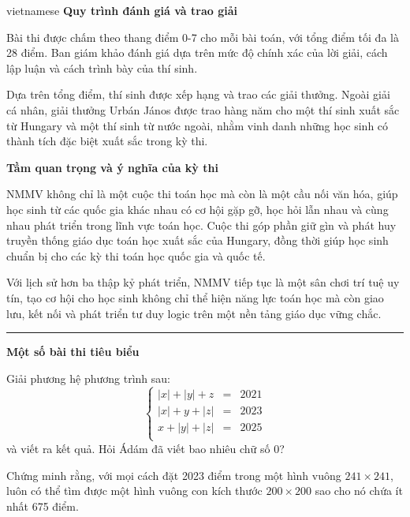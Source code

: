 \documentclass{article}
\begin{document}
\begin{otherlanguage*}{vietnamese}
\textbf{Quy trình đánh giá và trao giải}

Bài thi được chấm theo thang điểm 0-7 cho mỗi bài toán, với tổng điểm tối đa là 28 điểm.
Ban giám khảo đánh giá dựa trên mức độ chính xác của lời giải, cách lập luận và cách trình bày của thí sinh.

Dựa trên tổng điểm, thí sinh được xếp hạng và trao các giải thưởng.
Ngoài giải cá nhân, giải thưởng Urbán János được trao hàng năm cho một thí sinh xuất sắc từ Hungary và một thí sinh từ nước ngoài,
nhằm vinh danh những học sinh có thành tích đặc biệt xuất sắc trong kỳ thi.

\textbf{Tầm quan trọng và ý nghĩa của kỳ thi}

NMMV không chỉ là một cuộc thi toán học mà còn là một cầu nối văn hóa, giúp học sinh từ các quốc gia khác nhau có cơ hội gặp gỡ, học hỏi lẫn nhau và cùng nhau phát triển trong lĩnh vực toán học.
Cuộc thi góp phần giữ gìn và phát huy truyền thống giáo dục toán học xuất sắc của Hungary, đồng thời giúp học sinh chuẩn bị cho các kỳ thi toán học quốc gia và quốc tế.

Với lịch sử hơn ba thập kỷ phát triển, NMMV tiếp tục là một sân chơi trí tuệ uy tín, tạo cơ hội cho học sinh không chỉ thể hiện năng lực toán học mà còn giao lưu,
kết nối và phát triển tư duy logic trên một nền tảng giáo dục vững chắc.

\bigbreak

\noindent\rule{16.5cm}{0.4pt}

\textbf{Một số bài thi tiêu biểu}

\bigbreak

\begin{problem*}
    Giải phương hệ phương trình sau:
    \[
        \left\{
            \begin{array}{rcl}
                |x| + |y| + z &=& 2021\\
                |x| + y + |z| &=& 2023\\
                x + |y| + |z| &=& 2025\\
            \end{array}
        \right.
    \]
    và viết ra kết quả. Hỏi Ádám đã viết bao nhiêu chữ số \( 0 \)?
\end{problem*}

\begin{problem*}
    Chứng minh rằng, với mọi cách đặt 2023 điểm trong một hình vuông \( 241 \times 241 \),
    luôn có thể tìm được một hình vuông con kích thước \( 200 \times 200 \) sao cho nó chứa ít nhất 675 điểm.
\end{problem*}


\end{otherlanguage*}
\end{document}
